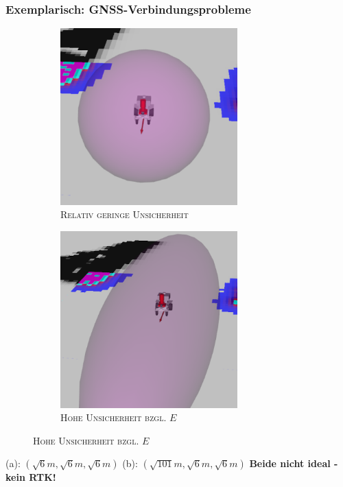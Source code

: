 \documentclass{beamer}
\begin{document}
\begin{frame}
  \frametitle{Exemplarisch: GNSS-Verbindungsprobleme}
  \begin{figure}[H]
    \centering
    \begin{subfigure}[b]{0.49\textwidth}
        \centering
        \includegraphics[width=0.75\textwidth]{img/GNSS_cov_low.png}
        \caption{\textsc{Relativ geringe Unsicherheit}}
    \end{subfigure}
    \hfill
    \begin{subfigure}[b]{0.49\textwidth}
        \centering
        \includegraphics[width=0.75\textwidth]{img/GNSS_cov_high.png}
        \caption{\textsc{Hohe Unsicherheit bzgl.} $E$}
    \end{subfigure}
  \end{figure}
  \centering
  (a): $(\sqrt{6}m, \sqrt{6}m, \sqrt{6}m)$\linebreak
  (b): $(\sqrt{101}m, \sqrt{6}m, \sqrt{6}m)$\linebreak
  \textbf{Beide nicht ideal - kein RTK!}
\end{frame}
\end{document}
